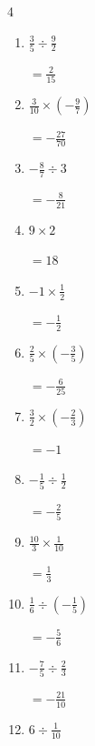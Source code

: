 \begin{multicols}{4}
\begin{enumerate}
        $\displaystyle =-\frac{9}{4}$

  \item $\displaystyle \frac{3}{5}\div{}\frac{9}{2}$

        $\displaystyle =\frac{2}{15}$

  \item $\displaystyle \frac{3}{10}\times{}\left(-\frac{9}{7}\right)$

        $\displaystyle =-\frac{27}{70}$

  \item $\displaystyle -\frac{8}{7}\div{}3$

        $\displaystyle =-\frac{8}{21}$

  \item $\displaystyle 9\times{}2$

        $\displaystyle =18$

  \item $\displaystyle -1\times{}\frac{1}{2}$

        $\displaystyle =-\frac{1}{2}$

  \item $\displaystyle \frac{2}{5}\times{}\left(-\frac{3}{5}\right)$

        $\displaystyle =-\frac{6}{25}$

  \item $\displaystyle \frac{3}{2}\times{}\left(-\frac{2}{3}\right)$

        $\displaystyle =-1$

\columnbreak %

  \item $\displaystyle -\frac{1}{5}\div{}\frac{1}{2}$

        $\displaystyle =-\frac{2}{5}$

  \item $\displaystyle \frac{10}{3}\times{}\frac{1}{10}$

        $\displaystyle =\frac{1}{3}$

  \item $\displaystyle \frac{1}{6}\div{}\left(-\frac{1}{5}\right)$

        $\displaystyle =-\frac{5}{6}$

  \item $\displaystyle -\frac{7}{5}\div{}\frac{2}{3}$

        $\displaystyle =-\frac{21}{10}$

  \item $\displaystyle 6\div{}\frac{1}{10}$


\end{enumerate}
\end{multicols}
